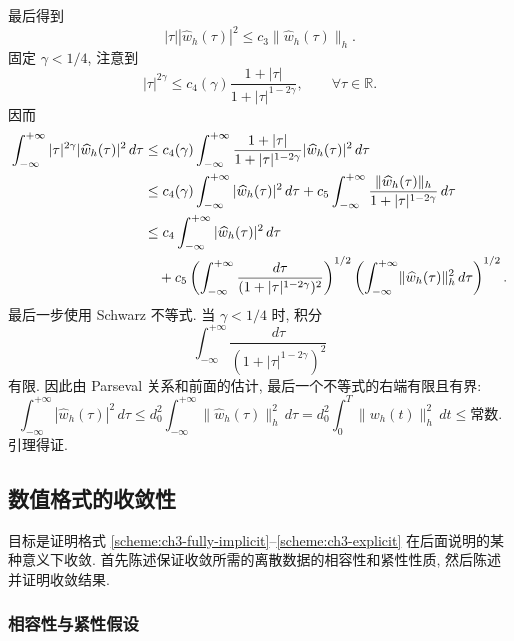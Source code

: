 \begin{Proof}
\hypertarget{chapter-03-page-253}{}
最后得到
\begin{equation}
|\tau||\widehat w_h(\tau)|^2
\leq c_3\lVert\widehat w_h(\tau)\rVert_h.
\label{eq:ch3-fractional-frequency-pointwise-bound}
\end{equation}
固定 $\gamma<1/4$, 注意到
\[
|\tau|^{2\gamma}\leq c_4(\gamma)
\frac{1+|\tau|}{1+|\tau|^{1-2\gamma}},
\qquad\forall\tau\in\mathbb R.
\]
因而
\begin{align}
\int_{-\infty}^{+\infty}|\tau|^{2\gamma}|\widehat w_h(\tau)|^2\,d\tau
&\leq c_4(\gamma)\int_{-\infty}^{+\infty}
\frac{1+|\tau|}{1+|\tau|^{1-2\gamma}}|\widehat w_h(\tau)|^2\,d\tau\notag\\
&\leq c_4(\gamma)\int_{-\infty}^{+\infty}|\widehat w_h(\tau)|^2\,d\tau
+c_5\int_{-\infty}^{+\infty}
\frac{\lVert\widehat w_h(\tau)\rVert_h}{1+|\tau|^{1-2\gamma}}\,d\tau\notag\\
&\leq c_4\int_{-\infty}^{+\infty}|\widehat w_h(\tau)|^2\,d\tau\notag\\
&\quad+c_5\left(\int_{-\infty}^{+\infty}
\frac{d\tau}{(1+|\tau|^{1-2\gamma})^2}\right)^{1/2}
\left(\int_{-\infty}^{+\infty}
\lVert\widehat w_h(\tau)\rVert_h^2\,d\tau\right)^{1/2}.
\label{eq:ch3-fractional-fourier-integral-estimate}
\end{align}
最后一步使用 Schwarz 不等式. 当 $\gamma<1/4$ 时, 积分
\[
\int_{-\infty}^{+\infty}
\frac{d\tau}{(1+|\tau|^{1-2\gamma})^2}
\]
有限. 因此由 Parseval 关系和前面的估计, 最后一个不等式的右端有限且有界:
\begin{equation}
\int_{-\infty}^{+\infty}|\widehat w_h(\tau)|^2\,d\tau
\leq d_0^2\int_{-\infty}^{+\infty}\lVert\widehat w_h(\tau)\rVert_h^2\,d\tau
=d_0^2\int_0^T\lVert w_h(t)\rVert_h^2\,dt\leq\text{常数}.
\label{eq:ch3-fractional-parseval-bound}
\end{equation}
引理得证.
\end{Proof}

\subsection{数值格式的收敛性}
\label{subsec:ch3-general-convergence}

目标是证明格式 \ref{scheme:ch3-fully-implicit}--\ref{scheme:ch3-explicit} 在后面说明的某种意义下收敛. 首先陈述保证收敛所需的离散数据的相容性和紧性性质, 然后陈述并证明收敛结果.

\subsubsection{相容性与紧性假设}
\label{subsubsec:ch3-consistency-compactness}

